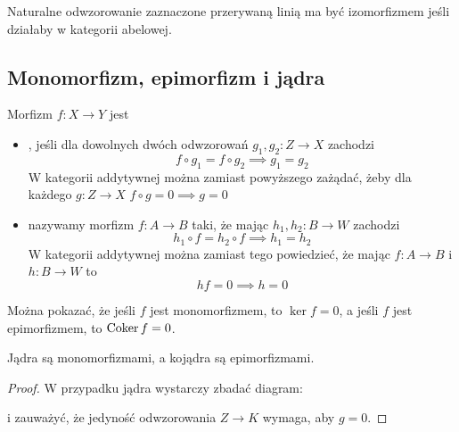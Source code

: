 \begin{itemize}
    \begin{center}\end{center}
    Naturalne odwzorowanie zaznaczone przerywaną linią ma być izomorfizmem jeśli działaby w kategorii abelowej.
\end{itemize}

\subsection{Monomorfizm, epimorfizm i jądra}

\begin{definition}
  Morfizm $f:X\to Y$ jest
  \begin{itemize}
    \item {}, jeśli dla dowolnych dwóch odwzorowań $g_1,g_2:Z\to X$ zachodzi
      $$f\circ g_1=f\circ g_2\implies g_1=g_2$$
      W kategorii addytywnej można zamiast powyższego zażądać, żeby dla każdego $g:Z\to X$ $f\circ g=0\implies g=0$
    \item {} nazywamy morfizm $f:A\to B$ taki, że mając $h_1,h_2:B\to W$ zachodzi
      $$h_1\circ f=h_2\circ f\implies h_1=h_2$$
      W kategorii addytywnej można zamiast tego powiedzieć, że mając $f:A\to B$ i $h:B\to W$ to
      $$hf=0\implies h=0$$
  \end{itemize}
\end{definition}

Można pokazać, że jeśli $f$ jest monomorfizmem, to $\ker f=0$, a jeśli $f$ jest epimorfizmem, to $\operatorname{Coker} f=0$.

\begin{lemma}
  Jądra są monomorfizmami, a kojądra są epimorfizmami.
\end{lemma}

\begin{proof}
  W przypadku jądra wystarczy zbadać diagram:
  \begin{center}\end{center}
  i zauważyć, że jedyność odwzorowania $Z\to K$ wymaga, aby $g=0$.
\end{proof}

